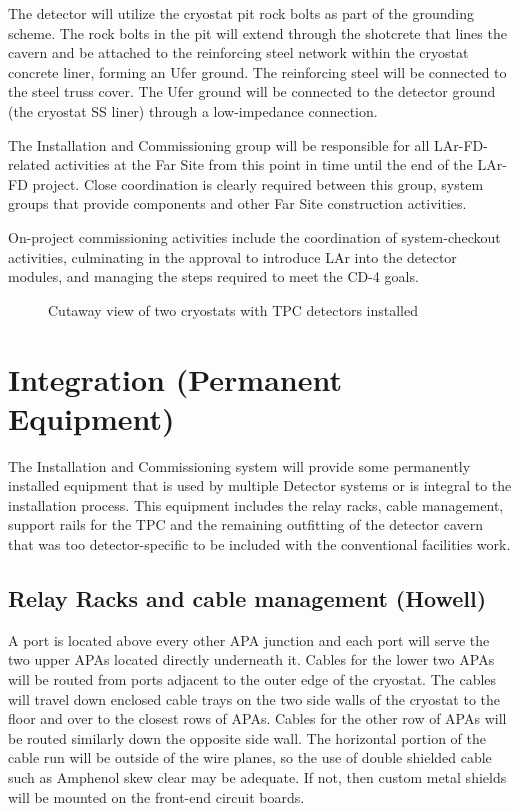 The detector will utilize the cryostat pit rock bolts as part of the grounding scheme. The rock bolts in the pit will extend through the shotcrete that lines the cavern and be attached to the reinforcing steel network within the cryostat concrete liner, forming an Ufer ground. The reinforcing steel will be connected to the steel truss cover. The Ufer ground will be connected to the detector ground (the cryostat SS liner) through a low-impedance connection.

The Installation and Commissioning group will be responsible for all LAr-FD-related activities at the Far Site from this point in time until the end of the LAr-FD project. Close coordination is clearly required between this group, system groups that provide components and other Far Site construction activities. 

On-project commissioning activities include the coordination of system-checkout activities, culminating in the approval to introduce LAr into the detector modules, and managing the steps required to meet the CD-4 goals. 

\begin{figure}[htpb]
\centering
\caption{Cutaway view of two cryostats with TPC detectors installed}
\label{fig:tpc-in-two-cryostats}
\end{figure}

\section{Integration (Permanent Equipment)}
\label{fd:install:integ}

The Installation and Commissioning system will provide some permanently installed equipment that is 
used by multiple Detector systems or is integral to the installation process.  This equipment includes the 
relay racks, cable management, support rails for the TPC and the remaining outfitting of the detector 
cavern that was too detector-specific to be included with the conventional facilities work.

\subsection{Relay Racks and cable management (Howell)}
\label{fd:install:integ:racks}

A port is located above every other APA junction and each port will serve the two upper APAs located directly underneath it. Cables for the lower two APAs will be routed from ports adjacent to the outer edge 
of the cryostat.  The cables will travel down enclosed cable trays on the two side walls of the cryostat to the floor and over to the closest rows of APAs.  Cables for the other row of APAs will be routed similarly 
down the opposite side wall.  The horizontal portion of the cable run will be outside of the wire planes, so the use of double shielded cable such as Amphenol skew clear may be adequate. If not, then custom metal shields will be mounted on the front-end circuit boards. 

